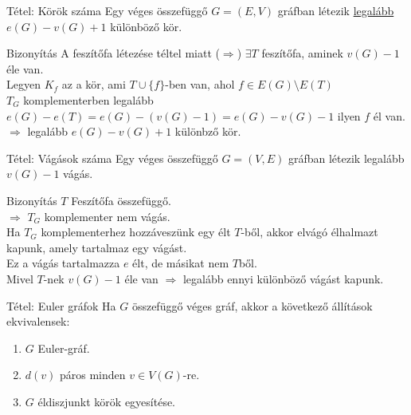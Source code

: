 \documentclass{beamer}
\begin{document}
\begin{frame} 

\begin{block}{Tétel: Körök száma}
Egy véges összefüggő $G = (E, V)$ gráfban létezik \underline{legalább} $e(G) - v(G) + 1$ különböző kör.

\end{block}

\begin{block}{Bizonyítás}
A feszítőfa létezése téltel miatt ($\Rightarrow$) $\exists T$ feszítőfa, aminek $v(G) - 1$ éle van.\\
Legyen $K_f$ az a kör, ami $T \cup \{f\}$-ben van, ahol $f \in E(G) \setminus E(T)$\\
$T_G$ komplementerben legalább $e(G) - e(T) = e(G) - (v(G) - 1) = e(G) - v(G) - 1$ ilyen $f$ él van.\\
$\Rightarrow$ legalább $e(G) - v(G) + 1$ különbző kör.

\end{block}

\end{frame}

\begin{frame}
\begin{block}{Tétel: Vágások száma}
Egy véges összefüggő $G = (V, E)$ gráfban létezik legalább $v(G) - 1$ vágás.
\end{block}

\begin{block}{Bizonyítás}
$T$ Feszítőfa összefüggő.\\
$\Rightarrow$ $T_G$ komplementer nem vágás.\\
Ha $T_G$ komplementerhez hozzáveszünk egy élt $T$-ből, akkor elvágó élhalmazt kapunk, amely tartalmaz egy vágást.\\
Ez a vágás tartalmazza $e$ élt, de másikat nem $T$ből.\\
Mivel $T$-nek $v(G) - 1$ éle van $\Rightarrow$ legalább ennyi különböző vágást kapunk.

\end{block}

\end{frame}

\begin{frame}

\begin{block}{Tétel: Euler gráfok}
Ha $G$ összefüggő véges gráf, akkor a következő állítások ekvivalensek:\\
\begin{enumerate}
\item $G$ Euler-gráf.
\item $d(v)$ páros minden $v \in V(G)$-re.
\item $G$ éldiszjunkt körök egyesítése.
\end{enumerate}
\end{block}

\end{frame}
\end{document}
